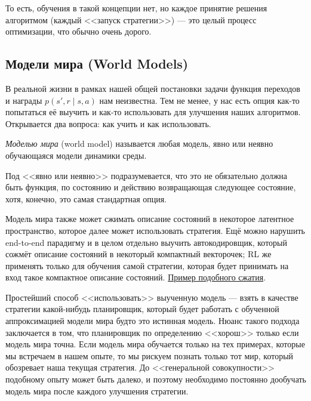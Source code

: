 То есть, обучения в такой концепции нет, но каждое принятие решения алгоритмом (каждый <<запуск стратегии>>) --- это целый процесс оптимизации, что обычно очень дорого.

\subsection{Модели мира (World Models)}

В реальной жизни в рамках нашей общей постановки задачи функция переходов и награды $p(s', r \mid s, a)$ нам неизвестна. Тем не менее, у нас есть опция как-то попытаться её выучить и как-то использовать для улучшения наших алгоритмов. Открывается два вопроса: как учить и как использовать.

\begin{definition}
\emph{Моделью мира} (world model) называется любая модель, явно или неявно обучающаяся модели динамики среды.
\end{definition}

Под <<явно или неявно>> подразумевается, что это не обязательно должна быть функция, по состоянию и действию возвращающая следующее состояние, хотя, конечно, это самая стандартная опция.

\begin{remark}
Модель мира также может сжимать описание состояний в некоторое латентное пространство, которое далее может использовать стратегия. Ещё можно нарушить end-to-end парадигму и в целом отдельно выучить автокодировщик, который сожмёт описание состояний в некоторый компактный векторочек; RL же применять только для обучения самой стратегии, которая будет принимать на вход такое компактное описание состояний. \href{https://worldmodels.github.io/assets/mp4/carracing_vae_compare.mp4}{Пример подобного сжатия}.
\end{remark}

Простейший способ <<использовать>> выученную модель --- взять в качестве стратегии какой-нибудь планировщик, который будет работать с обученной аппроксимацией модели мира будто это истинная модель. Нюанс такого подхода заключается в том, что планировщик по определению <<хорош>> только если модель мира точна. Если модель мира обучается только на тех примерах, которые мы встречаем в нашем опыте, то мы рискуем познать только тот мир, который обозревает наша текущая стратегия. До <<генеральной совокупности>> подобному опыту может быть далеко, и поэтому необходимо постоянно дообучать модель мира после каждого улучшения стратегии.

